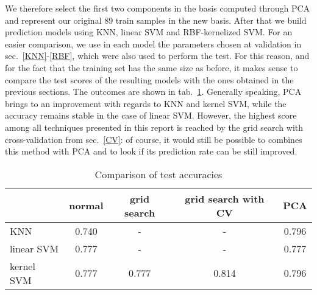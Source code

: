 \documentclass[11pt,twoside,a4paper]{article}
\begin{document}
We therefore select the first two components in the basis computed through PCA and represent our original 89 train samples in the new basis. After that we build prediction models using KNN, linear SVM and RBF-kernelized SVM. For an easier comparison, we use in each model the parameters chosen at validation in sec.~\ref{KNN}-\ref{RBF}, which were also used to perform the test. For this reason, and for the fact that the training set has the same size as before, it makes sense to compare the test scores of the resulting models with the ones obtained in the previous sections.\newline
The outcomes are shown in tab.~\ref{tab:accuracy}. Generally speaking, PCA brings to an improvement with regards to KNN and kernel SVM, while the accuracy remains stable in the case of linear SVM. However, the highest score among all techniques presented in this report is reached by the grid search with cross-validation from sec.~\ref{CV}: of course, it would still be possible to combines this method with PCA and to look if its prediction rate can be still improved.


\begin{table}[!h]
  \begin{adjustwidth}{-.5in}{-.5in}
  \begin{center}
    \begin{tabular}{l | c | c | c | c}
       & normal & grid search & grid search with CV & PCA  \\
      \hline
      KNN & 0.740 & - & - & 0.796 \\
      linear SVM & 0.777 & - & - & 0.777 \\
      kernel SVM & 0.777 & 0.777 & 0.814 & 0.796 \\
    \end{tabular}
    \caption{Comparison of test accuracies}
    \label{tab:accuracy}
  \end{center}
  \end{adjustwidth}
\end{table}
\end{document}
